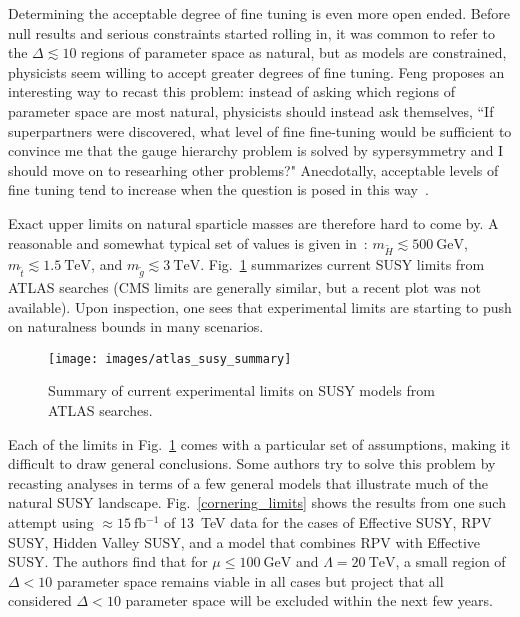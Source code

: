 \documentclass[12pt]{article}
\begin{document}
    Determining the acceptable degree of fine tuning is even more open ended. Before null results and serious constraints started rolling in, it was common to refer to the $\Delta \lesssim 10$ regions of parameter space as natural, but as models are constrained, physicists seem willing to accept greater degrees of fine tuning. Feng proposes an interesting way to recast this problem: instead of asking which regions of parameter space are most natural, physicists should instead ask themselves, ``If superpartners were discovered, what level of fine fine-tuning would be sufficient to convince me that the gauge hierarchy problem is solved by sypersymmetry and I should move on to researhing other problems?" Anecdotally, acceptable levels of fine tuning tend to increase when the question is posed in this way~\cite{feng}.

    Exact upper limits on natural sparticle masses are therefore hard to come by. A reasonable and somewhat typical set of values is given in~\cite{drees_kim}: $m_{\tilde{H}} \lesssim \SI{500}{\giga\electronvolt}$, $m_{\tilde{t}} \lesssim \SI{1.5}{\tera\electronvolt}$, and $m_{\tilde{g}} \lesssim \SI{3}{\tera\electronvolt}$. Fig.~\ref{atlas_susy_summary} summarizes current SUSY limits from ATLAS searches (CMS limits are generally similar, but a recent plot was not available). Upon inspection, one sees that experimental limits are starting to push on naturalness bounds in many scenarios.

    \noindent \begin{figure}[htbp] \begin{center}
    \texttt{[image: images/atlas\_susy\_summary]}
    \caption{Summary of current experimental limits on SUSY models from ATLAS searches.}
    \label{atlas_susy_summary}
    \end{center} \end{figure}

    Each of the limits in Fig.~\ref{atlas_susy_summary} comes with a particular set of assumptions, making it difficult to draw general conclusions. Some authors try to solve this problem by recasting analyses in terms of a few general models that illustrate much of the natural SUSY landscape. Fig.~\ref{cornering_limits} shows the results from one such attempt using $\approx \SI{15}{\femto\barn^{-1}}$ of \SI{13}{\tera\electronvolt} data for the cases of Effective SUSY, RPV SUSY, Hidden Valley SUSY, and a model that combines RPV with Effective SUSY. The authors find that for $\mu \leq \SI{100}{\giga\electronvolt}$ and $\Lambda = \SI{20}{\tera\electronvolt}$, a small region of $\Delta < 10$ parameter space remains viable in all cases but project that all considered $\Delta < 10$ parameter space will be excluded within the next few years.
    
\end{document}
